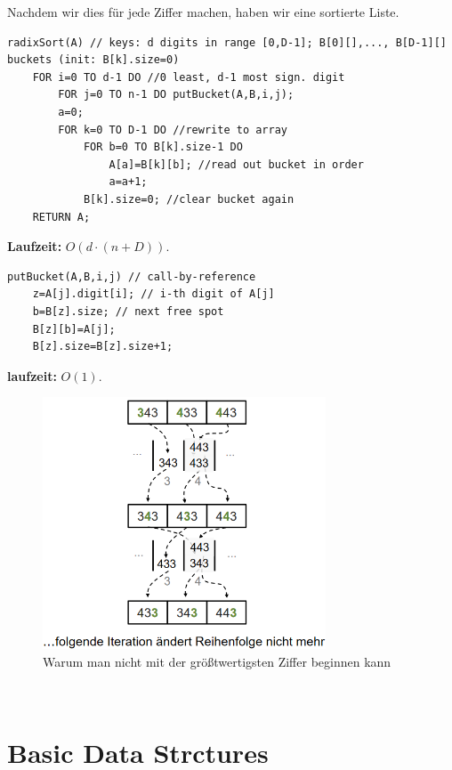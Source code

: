 \documentclass{article}
\begin{document}
            Nachdem wir dies für jede Ziffer machen, haben wir eine sortierte Liste.\\
            \begin{lstlisting}[style=pseudocode]
radixSort(A) // keys: d digits in range [0,D-1]; B[0][],..., B[D-1][] buckets (init: B[k].size=0)
    FOR i=0 TO d-1 DO //0 least, d-1 most sign. digit
        FOR j=0 TO n-1 DO putBucket(A,B,i,j);
        a=0;
        FOR k=0 TO D-1 DO //rewrite to array
            FOR b=0 TO B[k].size-1 DO
                A[a]=B[k][b]; //read out bucket in order
                a=a+1;
            B[k].size=0; //clear bucket again
    RETURN A;
            \end{lstlisting}
            \textbf{Laufzeit:} $O(d\cdot (n+D))$.
            \begin{lstlisting}[style=pseudocode]
putBucket(A,B,i,j) // call-by-reference
    z=A[j].digit[i]; // i-th digit of A[j]
    b=B[z].size; // next free spot
    B[z][b]=A[j];
    B[z].size=B[z].size+1;
            \end{lstlisting}
            \textbf{laufzeit:} $O(1)$.\\
            \begin{figure}[ht]
                \centering
                \includegraphics[width=0.75\textwidth]{Bilder/RadixW.png}
                \caption{Warum man nicht mit der größtwertigsten Ziffer beginnen kann}
                \label{fig:RadixW}
            \end{figure}\\

    \newpage

    \section{Basic Data Strctures}
\end{document}
